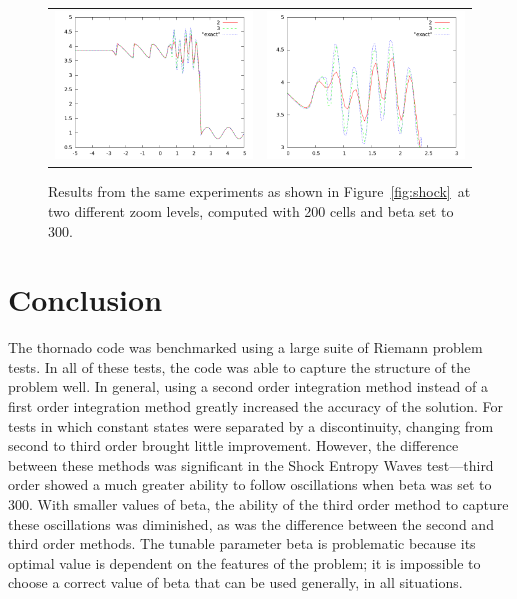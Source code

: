 \documentclass[10pt]{article}
\begin{document}
\begin{figure}
  \begin{center}
	\begin{tabular}{cc}
      \includegraphics[width=.475\textwidth]{300.png} &
	  \includegraphics[width=.475\textwidth]{300zoom.png}
	\end{tabular}
  \end{center}
  \caption{Results from the same experiments as shown in Figure~\ref{fig:shock}~at two different zoom levels, computed with 200 cells and beta set to 300.}
\end{figure}


\section{Conclusion}
The thornado code was benchmarked using a large suite of Riemann problem tests. In all of these tests, the code was able to capture the structure of the problem well. In general, using a second order integration method instead of a first order integration method greatly increased the accuracy of the solution. For tests in which constant states were separated by a discontinuity, changing from second to third order brought little improvement. However, the difference between these methods was significant in the Shock Entropy Waves test—third order showed a much greater ability to follow oscillations when beta was set to 300. With smaller values of beta, the ability of the third order method to capture these oscillations was diminished, as was the difference between the second and third order methods. The tunable parameter beta is problematic because its optimal value is dependent on the features of the problem; it is impossible to choose a correct value of beta that can be used generally, in all situations. 



\end{document}
